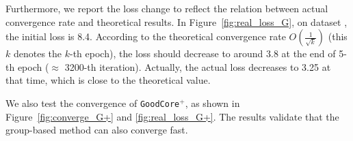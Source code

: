 Furthermore, we report the loss change to reflect the relation between  actual convergence rate and theoretical results. In Figure~\ref{fig:real_loss_G}, on dataset \hr, the initial loss is 8.4. According to the theoretical convergence rate $O(\frac{1}{\sqrt{k}})$ (this $k$ denotes the $k$-th epoch),  the loss should decrease to around 3.8 at the end of 5-th epoch ($\approx$ 3200-th iteration). Actually,  the  actual loss decreases to 3.25 at that time, which is close to the theoretical value.

We also test the convergence of \texttt{GoodCore}$^+$, as shown in Figure~\ref{fig:converge_G+} and 	\ref{fig:real_loss_G+}. The results  validate that the group-based method can also converge fast.

 


